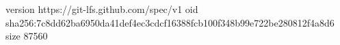 version https://git-lfs.github.com/spec/v1
oid sha256:7c8dd62ba6950da41def4ec3cdcf16388fcb100f348b99e722be280812f4a8d6
size 87560
